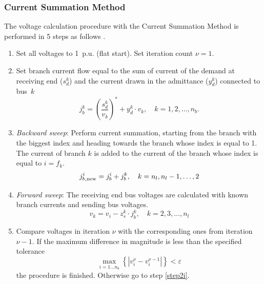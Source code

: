\documentclass[12pt]{article}
\newcommand{\cc}[1]{{#1}^{\ast}}                        %
\numberwithin{equation}{section}
\numberwithin{table}{section}
\numberwithin{figure}{section}
\begin{document}
\subsubsection{Current Summation Method}
The voltage calculation procedure with the Current Summation Method is performed in 5 steps as follows \cite{shirmohammadi1988,luo1990}.

\begin{enumerate}
  
  \item Set all voltages to 1~p.u. (flat start). Set iteration count $\nu = 1$.
  
  \item Set branch current flow equal to the sum of current of the demand at receiving end ($s_d^k$) and the current drawn in the admittance ($y_d^k$) connected to bus~$k$
  \begin{equation}
  \label{eq:j_branch}
  j_b^k = \cc{\left(\frac{s_d^k}{v_k}\right)} + y_d^k \cdot v_k, \quad k = 1, 2, \ldots ,n_b.
  \end{equation}
  \label{step2i}
  
  \item \textit{Backward sweep}: Perform current summation, starting from the branch with the biggest index and heading towards the branch whose index is equal to 1. The current of branch $k$ is added to the current of the branch whose index is equal to $i = f_k$.
  \begin{equation}
  j_{b,\rm new}^i = j_b^i + j_b^k, \quad k = n_l, n_l - 1, \ldots ,2
  \label{eq:back_i}
  \end{equation}
  
  \item \textit{Forward sweep}: The receiving end bus voltages are calculated with known branch currents and sending bus voltages.
  \begin{equation}
  \label{eq:for_i}
  v_k = v_i - z_s^k \cdot j_b^k, \quad k = 2, 3, \ldots ,n_l
  \end{equation}
  
  \item Compare voltages in iteration $\nu$ with the corresponding ones from iteration ${\nu - 1}$. If the maximum difference in magnitude is less than the specified tolerance
  \begin{equation}
  \max_{i = 1 \ldots n_b} \left\lbrace \left| v_i^{\nu} - v_i^{\nu - 1} \right| \right\rbrace < \varepsilon
  \label{eq:tol_i}
  \end{equation}
  the procedure is finished. Otherwise go to step \ref{step2i}.
  
\end{enumerate}
\end{document}
